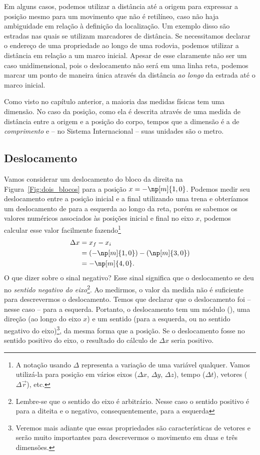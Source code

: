 Em alguns casos, podemos utilizar a distância até a origem para expressar a posição mesmo para um movimento que não é retilíneo, caso não haja ambiguidade em relação à definição da localização. Um exemplo disso são estradas nas quais se utilizam marcadores de distância. Se necessitamos declarar o endereço de uma propriedade ao longo de uma rodovia, podemos utilizar a distância em relação a um marco inicial. Apesar de esse claramente não ser um caso unidimensional, pois o deslocamento não será em uma linha reta, podemos marcar um ponto de maneira única através da distância \emph{ao longo} da estrada até o marco inicial.

Como visto no capítulo anterior, a maioria das medidas físicas tem uma dimensão. No caso da posição, como ela é descrita através de uma medida de distância entre a origem e a posição do corpo, tempos que a dimensão é a de \emph{comprimento} e -- no Sistema Internacional -- suas unidades são o metro.

\subsection{Deslocamento}

Vamos considerar um deslocamento do bloco da direita na Figura~\ref{Fig:dois_blocos} para a posição $x = -\np[m]{1,0}$. Podemos medir seu deslocamento entre a posição inicial e a final utilizando uma trena e obteríamos um deslocamento de  para a esquerda ao longo da reta, porém se sabemos os valores numéricos associados às posições inicial e final no eixo $x$, podemos calcular esse valor facilmente fazendo\footnote{A notação usando $\Delta$ representa a variação de uma variável qualquer. Vamos utilizá-la para posição em vários eixos ($\Delta x$, $\Delta y$, $\Delta z$), tempo ($\Delta t$), vetores ($\Delta\vec{r}$), etc.}
\begin{align}
  \Delta x &= x_f - x_i \\
  &= (-\np[m]{1,0}) - (\np[m]{3,0}) \\
  &= -\np[m]{4,0}.
\end{align}
%
O que dizer sobre o sinal negativo? Esse sinal significa que o deslocamento se deu no \emph{sentido negativo do eixo}\footnote{Lembre-se que o sentido do eixo é arbitrário. Nesse caso o sentido positivo é para a diteita e o negativo, consequentemente, para a esquerda}. Ao medirmos, o valor da medida não é suficiente para descrevermos o deslocamento. Temos que declarar que o deslocamento foi -- nesse caso -- para a esquerda. Portanto, o deslocamento tem um módulo (), uma direção (ao longo do eixo $x$) e um sentido (para a esquerda, ou no sentido negativo do eixo)\footnote{Veremos mais adiante que essas propriedades são características de vetores e serão muito importantes para descrevermos o movimento em duas e três dimensões.}, da mesma forma que a posição. Se o deslocamento fosse no sentido positivo do eixo, o resultado do cálculo de $\Delta x$ seria positivo. 

